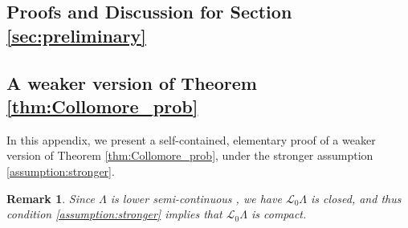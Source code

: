 \documentclass[aap,preprint]{imsart}
\newcommand{\bR}{{\mathbb{R}}}
\theoremstyle{plain}
\newtheorem{remark}{Remark}[section]
\theoremstyle{definition}
\begin{document}
\begin{appendix}

\section{Proofs and Discussion for Section \ref{sec:preliminary}}
\label{app:collamore_results}

\subsection{A weaker version of Theorem \ref{thm:Collomore_prob}} \label{app:discuss_collomore_prob}

In this appendix, we present a self-contained, elementary proof of a weaker version of Theorem \ref{thm:Collomore_prob}, under the stronger assumption \eqref{assumption:stronger}.


\begin{remark}
    \label{aux:remark_semi}
Since $\Lambda$ is lower semi-continuous \cite[Theorem 1.13]{brown1986fundamentals}, 
we have $\mathcal{L}_0\Lambda$ is closed, and thus condition \eqref{assumption:stronger} implies that $\mathcal{L}_0\Lambda$ is compact.
\end{remark}





\end{appendix}
\end{document}

